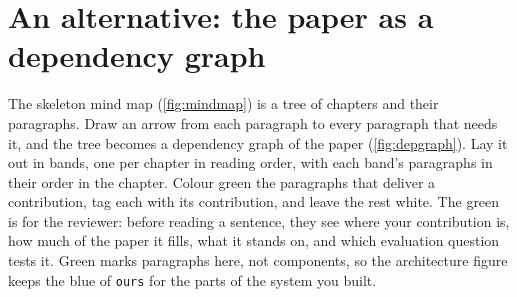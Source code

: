 \section{An alternative: the paper as a dependency graph}\label{app:writing:depgraph}
The skeleton mind map (\cref{fig:mindmap}) is a tree of chapters and their paragraphs. Draw an arrow from each paragraph to every paragraph that needs it, and the tree becomes a dependency graph of the paper (\cref{fig:depgraph}). Lay it out in bands, one per chapter in reading order, with each band's paragraphs in their order in the chapter. Colour green the paragraphs that deliver a contribution, tag each with its contribution, and leave the rest white. The green is for the reviewer: before reading a sentence, they see where your contribution is, how much of the paper it fills, what it stands on, and which evaluation question tests it. Green marks paragraphs here, not components, so the architecture figure keeps the blue of \texttt{ours} for the parts of the system you built.

